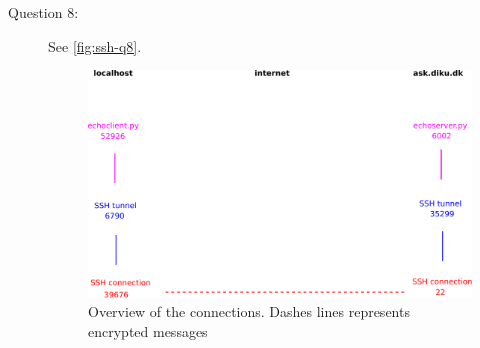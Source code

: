 \begin{description}
    \item[Question 8:]
    See \autoref{fig:ssh-q8}.
    \begin{center}
    \begin{figure}[!h]
        \includegraphics[width=0.5\paperwidth]{graphics/ssh-q8.pdf}
        \caption{\label{fig:ssh-q8}Overview of the connections. Dashes lines represents encrypted messages}
    \end{figure}
    \end{center}
\end{description}
